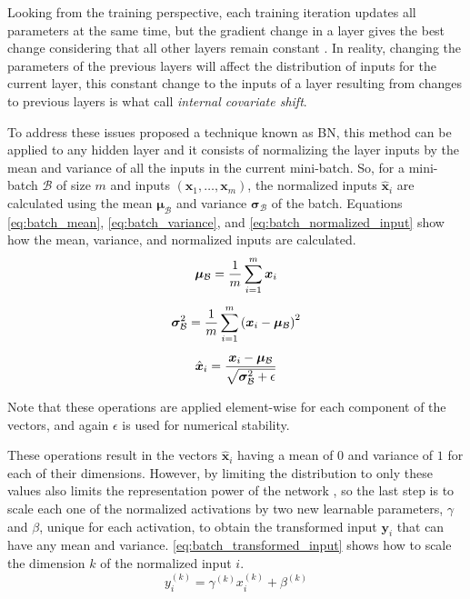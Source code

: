 Looking from the training perspective, each training iteration updates all parameters at the same time, but the gradient change in a layer gives the best change considering that all other layers remain constant \cite[p.313-314]{deepLearningBook2016}. In reality, changing the parameters of the previous layers will affect the distribution of inputs for the current layer, this constant change to the inputs of a layer resulting from changes to previous layers is what \textcite{batchnorm2015} call \textit{internal covariate shift}.

To address these issues \textcite{batchnorm2015} proposed a technique known as \gls{BN}, this method can be applied to any hidden layer and it consists of normalizing the layer inputs by the mean and variance of all the inputs in the current mini-batch. So, for a mini-batch $\mathcal{B}$ of size $m$ and inputs $(\bm{x}_1, \dots, \bm{x}_m)$, the normalized inputs $\hat{\bm{x}}_i$ are calculated using the mean $\bm{\mu}_{\mathcal{B}}$ and variance $\bm{\sigma}_{\mathcal{B}}$ of the batch. Equations \ref{eq:batch_mean}, \ref{eq:batch_variance}, and \ref{eq:batch_normalized_input} show how the mean, variance, and normalized inputs are calculated.
\begin{gather}
    \bm{\mu}_{\mathcal{B}} = \frac{1}{m}
    \sum_{i=1}^{m}{\bm{x}_i} \label{eq:batch_mean} \\[5pt]
    \bm{\sigma_}{\mathcal{B}}^2 = \frac{1}{m}
    \sum_{i=1}^{m}{ \left( \bm{x}_i - \bm{\mu}_{\mathcal{B}} \right)^2 } \label{eq:batch_variance} \\[5pt]
    \hat{\bm{x}}_i = \frac{ \bm{x}_i - \bm{\mu}_{\mathcal{B}} }
    { \sqrt{\bm{\sigma}_{\mathcal{B}}^2 + \epsilon} } \label{eq:batch_normalized_input}
\end{gather}

Note that these operations are applied element-wise for each component of the vectors, and again $\epsilon$ is used for numerical stability.

These operations result in the vectors $\hat{\bm{x}}_i$ having a mean of $0$ and variance of $1$ for each of their dimensions. However, by limiting the distribution to only these values also limits the representation power of the network \cite{batchnorm2015}, so the last step is to scale each one of the normalized activations by two new learnable parameters, $\gamma$ and $\beta$, unique for each activation, to obtain the transformed input $\bm{y}_i$ that can have any mean and variance. \autoref{eq:batch_transformed_input} shows how to scale the dimension $k$ of the normalized input $i$.
\begin{equation} \label{eq:batch_transformed_input}
    y_i^{(k)} = \gamma^{(k)} x_i^{(k)} + \beta^{(k)}
\end{equation}

